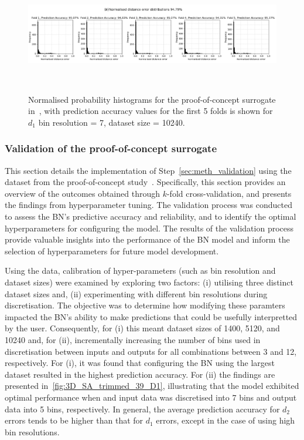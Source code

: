 \documentclass[journal]{IEEEtran}
\begin{document}
\begin{figure}
    \centering
    \includegraphics[width=\textwidth]{figures/validation_plots/PROCESS/st20_d1_7bins_folds.png}
    \caption{\small Normalised probability histograms for the proof-of-concept surrogate in~\cite{Griffiths2024}, with prediction accuracy values for the first 5 folds is shown for $d_{1}$ bin resolution = 7, dataset size = 10240.}~\label{fig:k-foldhistograms}
\end{figure}

\subsubsection{Validation of the proof-of-concept surrogate}\label{sec:res_validation}


This section details the implementation of Step~\ref{sec:meth_validation} using the dataset from the proof-of-concept study~\cite{Griffiths2024}. Specifically, this section provides an overview of the outcomes obtained through $k$-fold cross-validation, and presents the findings from hyperparameter tuning. The validation process was conducted to assess the BN's predictive accuracy and reliability, and to identify the optimal hyperparameters for configuring the model. The results of the validation process provide valuable insights into the performance of the BN model and inform the selection of hyperparameters for future model development.

Using the data, calibration of hyper-parameters (such as bin resolution and dataset sizes) were examined by exploring two factors: (i) utilising three distinct dataset sizes and, (ii) experimenting with different bin resolutions during discretisation. The objective was to determine how modifying these paramters impacted the BN's ability to make predictions that could be usefully interpretted by the user. Consequently, for (i) this meant dataset sizes of 1400, 5120, and 10240 and, for (ii), incrementally increasing the number of bins used in discretisation between inputs and outputs for all combinations between 3 and 12, respectively. For (i), it was found that configuring the BN using the largest dataset resulted in the highest prediction accuracy. For (ii) the findings are presented in~\ref{fig:3D_SA_trimmed_39_D1}, illustrating that the model exhibited optimal performance when and input data was discretised into 7 bins and output data into 5 bins, respectively. In general, the average prediction accuracy for $d_{2}$ errors tends to be higher than that for $d_{1}$ errors, except in the case of using high bin resolutions.
\end{document}
